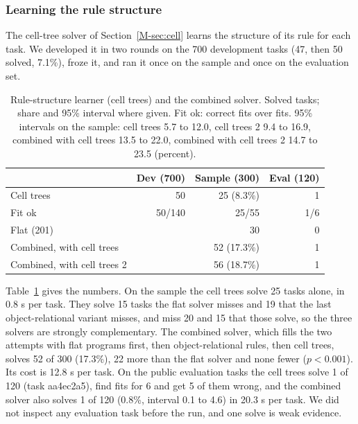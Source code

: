 \documentclass[sigconf,nonacm]{acmart}
\begin{document}
\subsubsection{Learning the rule structure}
\label{sec:celltree}

The cell-tree solver of Section~\ref{M-sec:cell} learns the structure of its rule for each task. We developed it in two rounds on the 700 development tasks (47, then 50 solved, 7.1\%), froze it, and ran it once on the sample and once on the evaluation set.

\begin{table}[t]
\caption{Rule-structure learner (cell trees) and the combined solver. Solved tasks; share and 95\% interval where given. Fit ok: correct fits over fits. 95\% intervals on the sample: cell trees 5.7 to 12.0, cell trees 2 9.4 to 16.9, combined with cell trees 13.5 to 22.0, combined with cell trees 2 14.7 to 23.5 (percent).}
\label{tab:cell}
\small
\begin{tabular}{@{}>{\raggedright\arraybackslash}p{3.1cm}rrr@{}}
\toprule
 & Dev (700) & Sample (300) & Eval (120) \\
\midrule
Cell trees & 50 & 25 (8.3\%) & 1 \\
Fit ok & 50/140 & 25/55 & 1/6 \\
Flat (201) & & 30 & 0 \\
Combined, with cell trees & & 52 (17.3\%) & 1 \\
Combined, with cell trees 2 & & 56 (18.7\%) & 1 \\
\bottomrule
\end{tabular}
\end{table}

Table~\ref{tab:cell} gives the numbers. On the sample the cell trees solve 25 tasks alone, in 0.8 s per task. They solve 15 tasks the flat solver misses and 19 that the last object-relational variant misses, and miss 20 and 15 that those solve, so the three solvers are strongly complementary. The combined solver, which fills the two attempts with flat programs first, then object-relational rules, then cell trees, solves 52 of 300 (17.3\%), 22 more than the flat solver and none fewer ($p<0.001$). Its cost is 12.8 s per task. On the public evaluation tasks the cell trees solve 1 of 120 (task aa4ec2a5), find fits for 6 and get 5 of them wrong, and the combined solver also solves 1 of 120 (0.8\%, interval 0.1 to 4.6) in 20.3 s per task. We did not inspect any evaluation task before the run, and one solve is weak evidence.
\end{document}
